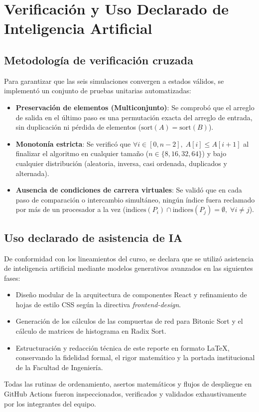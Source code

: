 \documentclass[11pt,letterpaper,oneside]{article}
\begin{document}
\section{Verificación y Uso Declarado de Inteligencia Artificial}

\subsection{Metodología de verificación cruzada}
Para garantizar que las seis simulaciones convergen a estados válidos, se implementó un conjunto de pruebas unitarias automatizadas:
\begin{itemize}
  \item \textbf{Preservación de elementos (Multiconjunto)}: Se comprobó que el arreglo de salida en el último paso es una permutación exacta del arreglo de entrada, sin duplicación ni pérdida de elementos ($\text{sort}(A) = \text{sort}(B)$).
  \item \textbf{Monotonía estricta}: Se verificó que $\forall i \in [0, n-2], \; A[i] \le A[i+1]$ al finalizar el algoritmo en cualquier tamaño ($n \in \{8, 16, 32, 64\}$) y bajo cualquier distribución (aleatoria, inversa, casi ordenada, duplicados y alternada).
  \item \textbf{Ausencia de condiciones de carrera virtuales}: Se validó que en cada paso de comparación o intercambio simultáneo, ningún índice fuera reclamado por más de un procesador a la vez ($\text{indices}(P_i) \cap \text{indices}(P_j) = \emptyset, \; \forall i \neq j$).
\end{itemize}

\subsection{Uso declarado de asistencia de IA}
De conformidad con los lineamientos del curso, se declara que se utilizó asistencia de inteligencia artificial mediante modelos generativos avanzados en las siguientes fases:
\begin{itemize}
  \item Diseño modular de la arquitectura de componentes React y refinamiento de hojas de estilo CSS según la directiva \emph{frontend-design}.
  \item Generación de los cálculos de las compuertas de red para Bitonic Sort y el cálculo de matrices de histograma en Radix Sort.
  \item Estructuración y redacción técnica de este reporte en formato \LaTeX, conservando la fidelidad formal, el rigor matemático y la portada institucional de la Facultad de Ingeniería.
\end{itemize}
Todas las rutinas de ordenamiento, asertos matemáticos y flujos de despliegue en GitHub Actions fueron inspeccionados, verificados y validados exhaustivamente por los integrantes del equipo.
\end{document}
